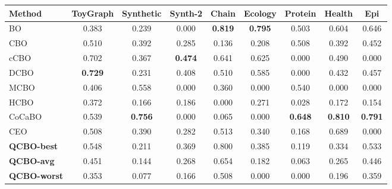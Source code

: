 \begin{tabular}{@{}lcccccccc@{}}
\toprule
\textbf{Method} & ToyGraph & Synthetic & Synth-2 & Chain & Ecology & Protein & Health & Epi \\
\midrule
BO & 0.383 & 0.239 & 0.000 & \textbf{0.819} & \textbf{0.795} & 0.503 & 0.604 & 0.646 \\
CBO & 0.510 & 0.392 & 0.285 & 0.136 & 0.208 & 0.508 & 0.392 & 0.452 \\
cCBO & 0.702 & 0.367 & \textbf{0.474} & 0.641 & 0.625 & 0.000 & 0.490 & 0.000 \\
DCBO & \textbf{0.729} & 0.231 & 0.408 & 0.510 & 0.585 & 0.000 & 0.432 & 0.457 \\
MCBO & 0.406 & 0.558 & 0.000 & 0.360 & 0.000 & 0.540 & 0.000 & 0.000 \\
HCBO & 0.372 & 0.166 & 0.186 & 0.000 & 0.271 & 0.028 & 0.172 & 0.154 \\
CoCaBO & 0.539 & \textbf{0.756} & 0.000 & 0.065 & 0.000 & \textbf{0.648} & \textbf{0.810} & \textbf{0.791} \\
CEO & 0.508 & 0.390 & 0.282 & 0.513 & 0.340 & 0.168 & 0.689 & 0.000 \\
\midrule
\textbf{QCBO-best} & 0.548 & 0.211 & 0.369 & 0.800 & 0.385 & 0.119 & 0.334 & 0.533 \\
\textbf{QCBO-avg} & 0.451 & 0.144 & 0.268 & 0.654 & 0.182 & 0.063 & 0.265 & 0.446 \\
\textbf{QCBO-worst} & 0.353 & 0.077 & 0.166 & 0.508 & 0.000 & 0.000 & 0.196 & 0.359 \\
\bottomrule
\end{tabular}

